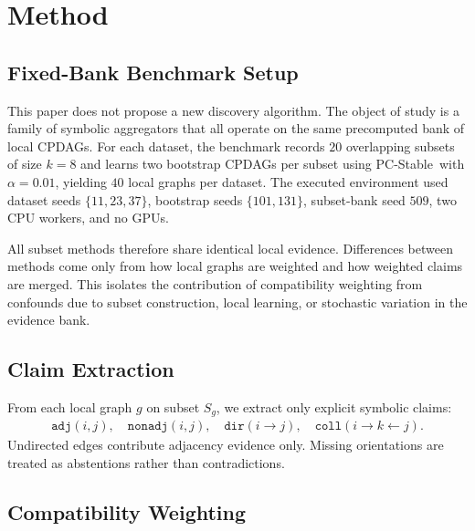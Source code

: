 \documentclass{article}
\newcommand{\pcstable}{PC-Stable}
\newcommand{\cpdag}{CPDAG}
\begin{document}
\section{Method}
\label{sec:method}

\subsection{Fixed-Bank Benchmark Setup}

This paper does not propose a new discovery algorithm. The object of study is a family of symbolic aggregators that all operate on the same precomputed bank of local \cpdag s. For each dataset, the benchmark records $20$ overlapping subsets of size $k=8$ and learns two bootstrap \cpdag s per subset using \pcstable\ with $\alpha=0.01$, yielding $40$ local graphs per dataset. The executed environment used dataset seeds $\{11,23,37\}$, bootstrap seeds $\{101,131\}$, subset-bank seed $509$, two CPU workers, and no GPUs.

All subset methods therefore share identical local evidence. Differences between methods come only from how local graphs are weighted and how weighted claims are merged. This isolates the contribution of compatibility weighting from confounds due to subset construction, local learning, or stochastic variation in the evidence bank.

\subsection{Claim Extraction}

From each local graph $g$ on subset $S_g$, we extract only explicit symbolic claims:
\begin{align*}
  \texttt{adj}(i,j), \quad
  \texttt{nonadj}(i,j), \quad
  \texttt{dir}(i \rightarrow j), \quad
  \texttt{coll}(i \rightarrow k \leftarrow j).
\end{align*}
Undirected edges contribute adjacency evidence only. Missing orientations are treated as abstentions rather than contradictions.

\subsection{Compatibility Weighting}
\end{document}
